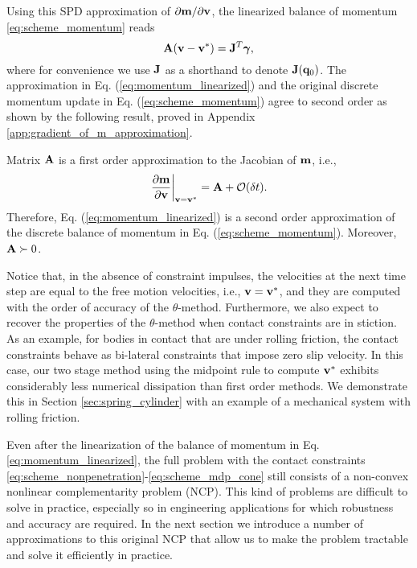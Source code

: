 Using this SPD approximation of $\partial {\mathbf{m}}/\partial {\mathbf{v}}$, the
linearized balance of momentum \eqref{eq:scheme_momentum} reads
\begin{equation}
	\mf{A}(\mf{v}-\mf{v}^*) = \mf{J}^T\mf{\bgamma},
	\label{eq:momentum_linearized}
\end{equation}
where for convenience we use ${\mathbf{J}}$ as a shorthand to denote
${\mathbf{J}}({\mathbf{q}}_0)$. The approximation in Eq. (\ref{eq:momentum_linearized}) and
the original discrete momentum update in Eq. (\ref{eq:scheme_momentum}) agree to
second order as shown by the following result, proved in Appendix
\ref{app:gradient_of_m_approximation}.
\begin{prop}	
Matrix ${\mathbf{A}}$ is a first order approximation to the Jacobian of ${\mathbf{m}}$,
i.e.,
\begin{align*}
	\left. \frac{\partial {\mathbf{m}}}{\partial {\mathbf{v}}} \right|_{{\mathbf{v}}={\mathbf{v}}^*} = {\mathbf{A}} + \mathcal{O}(\delta t).
\end{align*}
Therefore, Eq. (\ref{eq:momentum_linearized}) is a second order approximation of
the discrete balance of momentum in Eq. (\ref{eq:scheme_momentum}). Moreover,
${\mathbf{A}} \succ 0$.
\label{prop:gradient_of_m_approximation}
\end{prop}

Notice that, in the absence of constraint impulses, the velocities at the next
time step are equal to the free motion velocities, i.e., ${\mathbf{v}}={\mathbf{v}}^*$, and
they are computed with the order of accuracy of the $\theta\text{-method}$.
Furthermore, we also expect to recover the properties of the
$\theta\text{-method}$ when contact constraints are in stiction. As an example,
for bodies in contact that are under rolling friction, the contact constraints
behave as bi-lateral constraints that impose zero slip velocity. In this case,
our two stage method using the midpoint rule to compute ${\mathbf{v}}^*$ exhibits
considerably less numerical dissipation than first order methods. We demonstrate
this in Section \ref{sec:spring_cylinder} with an example of a mechanical system
with rolling friction.

Even after the linearization of the balance of momentum in Eq.
\eqref{eq:momentum_linearized}, the full problem with the contact constraints
\eqref{eq:scheme_nonpenetration}-\eqref{eq:scheme_mdp_cone} still consists of a
non-convex nonlinear complementarity problem (NCP). This kind of problems are
difficult to solve in practice, especially so in engineering applications for
which robustness and accuracy are required. In the next section we introduce a
number of approximations to this original NCP that allow us to make the problem
tractable and solve it efficiently in practice.
